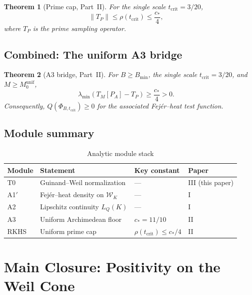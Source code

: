 \documentclass[11pt,a4paper]{article}
\newtheorem{theorem}{Theorem}[section]
\theoremstyle{definition}
\newcommand{\WW}{\mathcal{W}}
\begin{document}
\begin{theorem}[Prime cap, Part~II]\label{thm:prime-cap}
For the single scale $t_{\mathrm{crit}} = 3/20$,
\[
\|T_P\| \le \rho(t_{\mathrm{crit}}) \le \frac{c_*}{4},
\]
where $T_P$ is the prime sampling operator.
\end{theorem}

\subsection{Combined: The uniform A3 bridge}

\begin{theorem}[A3 bridge, Part~II]\label{thm:A3-bridge}
For $B \ge B_{\min}$, the single scale $t_{\mathrm{crit}} = 3/20$, and $M \ge M_0^{\mathrm{unif}}$,
\[
\lambda_{\min}(T_M[P_A] - T_P) \ge \frac{c_*}{4} > 0.
\]
Consequently, $Q(\Phi_{B,t_{\mathrm{crit}}}) \ge 0$ for the associated Fej\'er--heat test function.
\end{theorem}

\subsection{Module summary}

\begin{table}[h]
\centering
\caption{Analytic module stack}
\label{tab:modules}
\begin{tabular}{llll}
\hline
\textbf{Module} & \textbf{Statement} & \textbf{Key constant} & \textbf{Paper} \\
\hline
T0 & Guinand--Weil normalization & --- & III (this paper) \\
A1$'$ & Fej\'er--heat density on $\WW_K$ & --- & I \\
A2 & Lipschitz continuity $L_Q(K)$ & --- & I \\
A3 & Uniform Archimedean floor & $c_* = 11/10$ & II \\
RKHS & Uniform prime cap & $\rho(t_{\mathrm{crit}}) \le c_*/4$ & II \\
\hline
\end{tabular}
\end{table}

\section{Main Closure: Positivity on the Weil Cone}\label{sec:closure}
\end{document}
